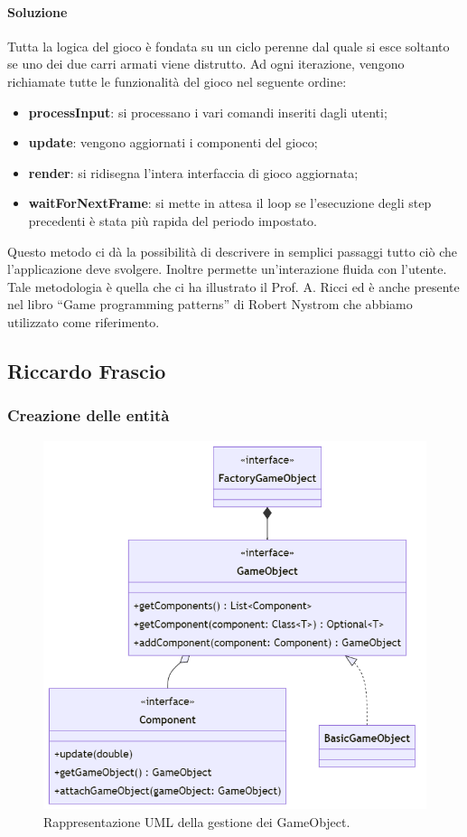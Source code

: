 \documentclass[a4paper,12pt]{report}
\begin{document}
\paragraph*{Soluzione} Tutta la logica del gioco è fondata su un ciclo perenne dal quale si esce soltanto se uno dei due carri armati viene distrutto. Ad ogni iterazione, vengono richiamate tutte le funzionalità del gioco nel seguente ordine:
\begin{itemize}
	\item \textbf{processInput}:
	si processano i vari comandi inseriti dagli utenti;
	\item \textbf{update}:
	vengono aggiornati i componenti del gioco;
	\item \textbf{render}:
	si ridisegna l’intera interfaccia di gioco aggiornata;
	\item \textbf{waitForNextFrame}:
	si mette in attesa il loop se l’esecuzione degli step precedenti è stata più rapida del periodo impostato.
\end{itemize}
Questo metodo ci dà la possibilità di descrivere in semplici passaggi tutto ciò che l’applicazione deve svolgere. Inoltre permette un’interazione fluida con l’utente.
Tale metodologia è quella che ci ha illustrato il Prof. A. Ricci ed è anche presente nel libro “Game programming patterns” di Robert Nystrom che abbiamo utilizzato come riferimento.
%
\newpage
\subsection*{Riccardo Frascio}
%
\subsubsection*{Creazione delle entità}
%
\begin{figure}[H]
	\centering{}
	\includegraphics[scale=0.60]{img/gameObject.png}
	\caption{Rappresentazione UML della gestione dei GameObject.}
	\end{figure}
%
\end{document}
